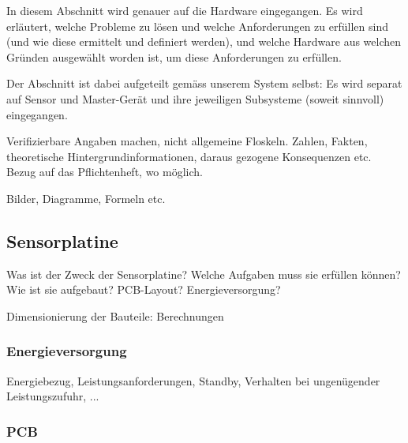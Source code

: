 In  diesem  Abschnitt  wird  genauer auf  die  Hardware  eingegangen. Es  wird
erl\"autert, welche Probleme zu l\"osen und welche Anforderungen zu erf\"ullen
sind  (und wie  diese ermittelt  und  definiert werden),  und welche  Hardware
aus  welchen Gr\"unden  ausgew\"ahlt  worden ist,  um  diese Anforderungen  zu
erf\"ullen.

Der Abschnitt  ist dabei  aufgeteilt gem\"ass  unserem System  selbst: Es wird
separat auf Sensor  und Master-Ger\"at und ihre  jeweiligen Subsysteme (soweit
sinnvoll) eingegangen.

\anweisung Verifizierbare  Angaben machen, nicht  allgemeine Floskeln. Zahlen,
Fakten,  theoretische Hintergrundinformationen,  daraus gezogene  Konsequenzen
etc. Bezug auf das Pflichtenheft, wo m\"oglich.

\anweisung Bilder, Diagramme, Formeln etc.


\subsection{Sensorplatine}
\label{subsec:hw:sensorplatine}

Was  ist der  Zweck  der Sensorplatine? Welche  Aufgaben  muss sie  erf\"ullen
k\"onnen? Wie ist sie aufgebaut? PCB-Layout? Energieversorgung?

\anweisung Dimensionierung der Bauteile: Berechnungen

\subsubsection{Energieversorgung}
\label{subsubsec:sensor:pcb}

Energiebezug,  Leistungsanforderungen, Standby,  Verhalten bei  ungen\"ugender
Leistungszufuhr, ...


\subsubsection{PCB}
\label{subsubsec:sensor:pcb}

